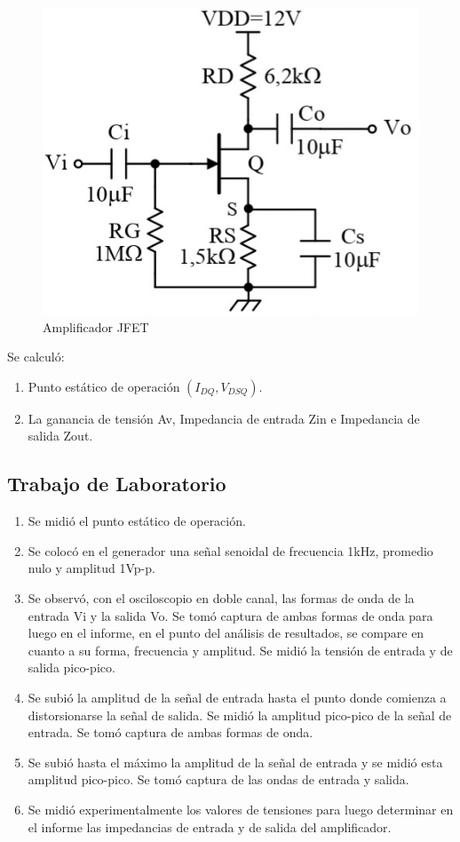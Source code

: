 \documentclass[12pt, a4paper]{article}
\begin{document}
    \begin{figure}[h!]
        \centering
        \includegraphics[height=5cm\textwidth]{amplificador.jpg}
        \caption{Amplificador JFET}
        \label{fig:amp}
    \end{figure}

    Se calculó:

    \begin{enumerate}
        \item \label{p11}	Punto estático de operación $(I_{DQ}, V_{DSQ})$.
        \item \label{p12}	La ganancia de tensión Av, Impedancia de entrada Zin e Impedancia de salida Zout.
    \end{enumerate}

    \subsection{Trabajo de Laboratorio}

    \begin{enumerate}
        \item \label{p21}   Se midió el punto estático de operación.
        \item \label{p22}	Se colocó en el generador una señal senoidal de frecuencia 1kHz, promedio nulo y amplitud 1Vp-p.
        \item \label{p23} 	Se observó, con el osciloscopio en doble canal, las formas de onda de la entrada Vi y la salida Vo. Se tomó captura de ambas formas de onda para luego en el informe, en el punto del análisis de resultados, se compare en cuanto a su forma, frecuencia y amplitud. Se midió la tensión de entrada y de salida pico-pico.
        \item \label{p24} 	Se subió la amplitud de la señal de entrada hasta el punto donde comienza a distorsionarse la señal de salida. Se midió la amplitud pico-pico de la señal de entrada. Se tomó captura de ambas formas de onda.
        \item \label{p25} 	Se subió hasta el máximo la amplitud de la señal de entrada y se midió esta amplitud pico-pico. Se tomó captura de las ondas de entrada y salida.
        \item \label{p26} Se midió experimentalmente los valores de tensiones para luego determinar en el informe las impedancias de entrada y de salida del amplificador.
    \end{enumerate}
\end{document}
